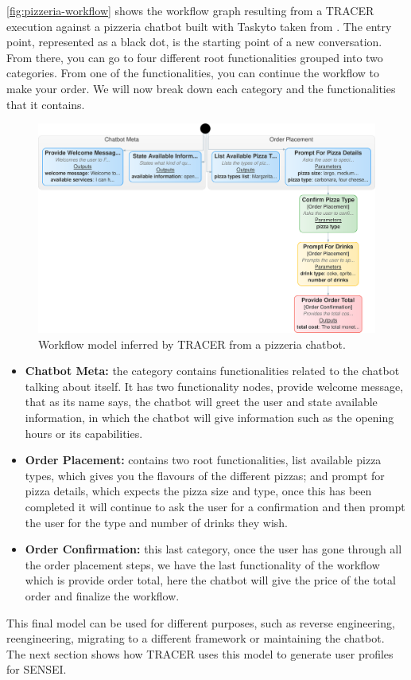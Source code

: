 \autoref{fig:pizzeria-workflow}
shows the workflow graph resulting from a \ac{TRACER} execution
against a pizzeria chatbot built with Taskyto taken from
\autocite{sanchezcuadradoAutomatingDevelopmentTaskoriented2024}.
The entry point, represented as a black dot,
is the starting point of a new conversation.
From there, you can go to four different root functionalities
grouped into two categories.
From one of the functionalities,
you can continue the workflow to make your order.
We will now break down each category
and the functionalities that it contains.

\begin{figure}[!htb]
  \centering
  \includegraphics[width=\linewidth]{figures/workflow_graph-crop-back.pdf}
  \caption{
    Workflow model inferred by \ac{TRACER} from a pizzeria chatbot.
  }
  \label{fig:pizzeria-workflow}
\end{figure}

\begin{itemize}
  \item \textbf{Chatbot Meta:}
    the category contains functionalities related to the chatbot talking about itself.
    It has two functionality nodes, provide welcome message, that as its name says,
    the chatbot will greet the user
    and state available information,
    in which the chatbot will give information such as
    the opening hours or its capabilities.

  \item \textbf{Order Placement:}
    contains two root functionalities,
    list available pizza types,
    which gives you the flavours of the different pizzas;
    and prompt for pizza details,
    which expects the pizza size and type,
    once this has been completed
    it will continue to ask the user for a confirmation
    and then prompt the user for the type and number of drinks they wish.

  \item \textbf{Order Confirmation:}
    this last category,
    once the user has gone through all the order placement steps,
    we have the last functionality of the workflow which is
    provide order total,
    here the chatbot will give the price of the total order
    and finalize the workflow.
\end{itemize}

This final model can be used for different purposes,
such as reverse engineering, reengineering,
migrating to a different framework
or maintaining the chatbot.
The next section shows how \ac{TRACER} uses this model
to generate user profiles for SENSEI.
